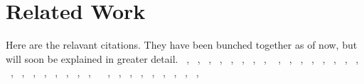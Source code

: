 \section{Related Work}
\label{sec:related}

Here are the relavant citations. They have been bunched together as of now, but
will soon be explained in greater detail. ~\cite{brandes01:_mathsoc},
~\cite{dijkstra59}, ~\cite{bellman58}, ~\cite{Meyer03:DeltaStepping},
~\cite{meyer-diss}, ~\cite{Meyer03:DeltaStepping}, ~\cite{Frieze85},
~\cite{Hassin85}, ~\cite{floyd62} , ~\cite{warshall62}, ~\cite{Blondel07},
~\cite{Miller85}, ~\cite{clr90}, ~\cite{Chakrabarti04:Recursive},
~\cite{LogGP95}, ~\cite{Val90}, ~\cite{ParallelBGL}, ~\cite{boost},
~\cite{Bader07:ApproxBC}, ~\cite{Sabidussi66}, ~\cite{Anthonisse71,Freeman77},
~\cite{floyd62,JohnsonSSSP77,warshall62}, ~\cite{jaja92:intro_parallel_alg},
~\cite{CrauserMehlhornMeyerSSSP98}, ~\cite{edmonds06:dimacs}
~\cite{Madduri07:ALEXNEX}, ~\cite{Bader06:centrality}, ~\cite{Madduri09:MTAAP},
~\cite{Yang05}, ~\cite{Bollobas01:random_graphs},
~\cite{CrauserMehlhornMeyerSSSP98}, ~\cite{Jenq87}, ~\cite{Kumar91},
~\cite{Santos:2006}, ~\cite{Madduri:2009}
